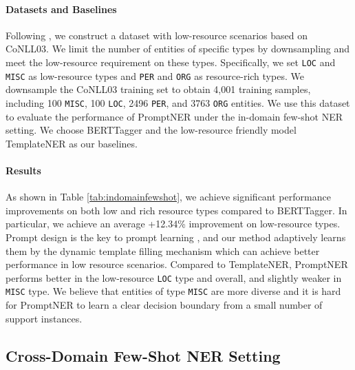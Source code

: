 \documentclass[11pt]{article}
\begin{document}
\paragraph{Datasets and Baselines} Following \citet{cui-etal-2021-template}, we construct a dataset with low-resource scenarios based on CoNLL03. We limit the number of entities of specific types by downsampling and meet the low-resource requirement on these types. Specifically, we set \texttt{LOC} and \texttt{MISC} as low-resource types and \texttt{PER} and \texttt{ORG} as resource-rich types. We downsample the CoNLL03 training set to obtain 4,001 training samples, including 100 \texttt{MISC}, 100 \texttt{LOC}, 2496 \texttt{PER}, and 3763 \texttt{ORG} entities. 
We use this dataset to evaluate the performance of PromptNER under the in-domain few-shot NER setting. We choose BERTTagger \citep{devlin-etal-2019-bert} and the low-resource friendly model TemplateNER \citep{cui-etal-2021-template} as our baselines.


\paragraph{Results} As shown in Table \ref{tab:indomainfewshot}, we achieve significant performance improvements on both low and rich resource types compared to BERTTagger. In particular, we achieve an average +12.34\% improvement on low-resource types. Prompt design is the key to prompt learning \citep{https://doi.org/10.48550/arxiv.2107.13586}, and our method adaptively learns them by the dynamic template filling mechanism which can achieve better performance in low resource scenarios. Compared to TemplateNER, PromptNER performs better in the low-resource \texttt{LOC} type and overall, and slightly weaker in \texttt{MISC} type.
We believe that entities of type \texttt{MISC} are more diverse and it is hard for PromptNER to learn a clear decision boundary from a small number of support instances.




\subsection{Cross-Domain Few-Shot NER Setting}
\label{crossdomain}
\end{document}
